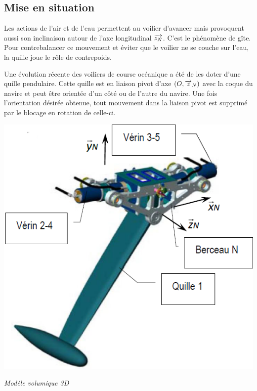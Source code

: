 \documentclass[10pt,fleqn]{article} %
\begin{document}

\vspace{4.5cm}
\pagestyle{fancy}
\thispagestyle{plain}


\def\columnseprulecolor{\color{ocre}}
\setlength{\columnseprule}{0.4pt} 

\ifprof
\else
\begin{multicols}{2}
\fi

\section*{Mise en situation}
\ifprof
\else

Les actions de l'air et de l'eau permettent au voilier d'avancer mais provoquent aussi son inclinaison autour de l'axe longitudinal $\overrightarrow{z_N}$. C’est le phénomène de gîte. Pour contrebalancer ce mouvement et éviter que le voilier ne se couche sur l’eau, la quille joue le rôle de contrepoids. 



Une évolution récente des voiliers de course océanique a été de les doter d’une quille pendulaire. Cette quille est en liaison pivot d’axe $\left(O,\overrightarrow{z}_N \right)$ avec la coque du navire et peut être orientée d’un côté ou de l’autre du navire. Une fois l’orientation désirée obtenue, tout mouvement dans la liaison pivot est supprimé par le blocage en rotation de celle-ci. 

\begin{center}
\includegraphics[width=.6\linewidth]{images/fig_03}

\textit{Modèle volumique 3D}
\end{center}



\end{multicols}
\end{document}
